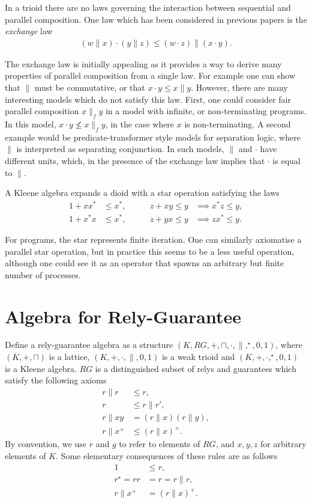 \documentclass{llncs}
\begin{document}
In a trioid there are no laws governing the interaction between
sequential and parallel composition. One law which has been considered
in previous papers is the \emph{exchange} law
\begin{align*}
  (w \| x) \cdot (y \| z) \le (w \cdot z) \| (x \cdot y).
\end{align*}

The exchange law is initially appealing as it provides a way to derive
many properties of parallel composition from a single law. For example
one can show that $\|$ must be commutative, or that $x\cdot y \le
x\|y$. However, there are many interesting models which do not satisfy
this law. First, one could consider fair parallel composition
$x\parallel_f y$ in a model with infinite, or non-terminating
programs. In this model, $x \cdot y \not\leq x \parallel_f y$, in the
case where $x$ is non-terminating. A second example would be
predicate-transformer style models for separation logic, where $\|$ is
interpreted as separating conjunction. In such models, $\|$ and
$\cdot$ have different units, which, in the presence of the exchange
law implies that $\cdot$ is equal to $\|$.

A Kleene algebra expands a dioid with a star operation satisfying the laws
\begin{align*}
  1 + xx^* &\le x^*, &\qquad z + xy \le y &\implies x^*z \le y,\\
  1 + x^*x &\le x^*, &\qquad z + yx \le y &\implies zx^* \le y.
\end{align*}

For programs, the star represents finite iteration. One can similarly
axiomatise a parallel star operation, but in practice this seems to be
a less useful operation, although one could see it as an operator that
spawns an arbitrary but finite number of processes.

\newpage
\section{Algebra for Rely-Guarantee}
\label{sec:RG}

Define a rely-guarantee algebra as a structure
$(K,RG,+,\sqcap,\cdot,\|,^\star,0,1)$, where $(K,+,\sqcap)$ is a
lattice, $(K,+,\cdot,\|,0,1)$ is a weak trioid and
$(K,+,\cdot,^\star,0,1)$ is a Kleene algebra. $RG$ is a distinguished
subset of relys and guarantees which satisfy the following axioms
\begin{align}
r\|r &\le r, \label{rg1}\\
r &\le r\|r', \label{rg2}\\
r\|xy &= (r\|x)(r\|y), \label{rg3}\\
r\|x^+ &\le (r\|x)^+ \label{rg4}.
\end{align}
By convention, we use $r$ and $g$ to refer to elements of $RG$, and
$x,y,z$ for arbitrary elements of $K$. Some elementary consequences of these rules are as follows
\begin{align*}
1 &\le r,\\
r^\star = rr &= r = r\|r,\\
r\|x^+ &= (r\|x)^+.
\end{align*}
\end{document}
